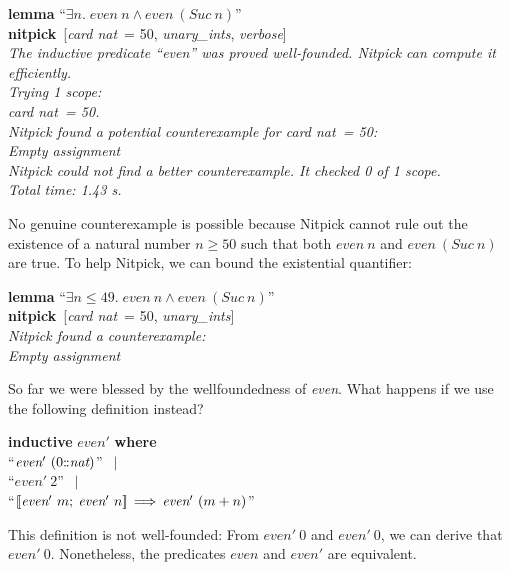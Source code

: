 \documentclass[a4paper,12pt]{article}
\def\Colon{\mathord{:\mkern-1.5mu:}}
\begin{document}
\prew
\textbf{lemma} ``$\exists n.\; \textit{even}~n \mathrel{\land} \textit{even}~(\textit{Suc}~n)$'' \\
\textbf{nitpick}~[\textit{card nat}~= 50, \textit{unary\_ints}, \textit{verbose}] \\[2\smallskipamount]
\slshape The inductive predicate ``\textit{even}'' was proved well-founded.
Nitpick can compute it efficiently. \\[2\smallskipamount]
Trying 1 scope: \\
\hbox{}\qquad \textit{card nat}~= 50. \\[2\smallskipamount]
Nitpick found a potential counterexample for \textit{card nat}~= 50: \\[2\smallskipamount]
\hbox{}\qquad Empty assignment \\[2\smallskipamount]
Nitpick could not find a better counterexample. It checked 0 of 1 scope. \\[2\smallskipamount]
Total time: 1.43 s.
\postw

No genuine counterexample is possible because Nitpick cannot rule out the
existence of a natural number $n \ge 50$ such that both $\textit{even}~n$ and
$\textit{even}~(\textit{Suc}~n)$ are true. To help Nitpick, we can bound the
existential quantifier:

\prew
\textbf{lemma} ``$\exists n \mathbin{\le} 49.\; \textit{even}~n \mathrel{\land} \textit{even}~(\textit{Suc}~n)$'' \\
\textbf{nitpick}~[\textit{card nat}~= 50, \textit{unary\_ints}] \\[2\smallskipamount]
\slshape Nitpick found a counterexample: \\[2\smallskipamount]
\hbox{}\qquad Empty assignment
\postw

So far we were blessed by the wellfoundedness of \textit{even}. What happens if
we use the following definition instead?

\prew
\textbf{inductive} $\textit{even}'$ \textbf{where} \\
``$\textit{even}'~(0{\Colon}\textit{nat})$'' $\,\mid$ \\
``$\textit{even}'~2$'' $\,\mid$ \\
``$\mathopen{[\![}\textit{even}'~m;\> \textit{even}'~n\mathclose{]\!]} \,\Longrightarrow\, \textit{even}'~(m + n)$''
\postw

This definition is not well-founded: From $\textit{even}'~0$ and
$\textit{even}'~0$, we can derive that $\textit{even}'~0$. Nonetheless, the
predicates $\textit{even}$ and $\textit{even}'$ are equivalent.
\end{document}
